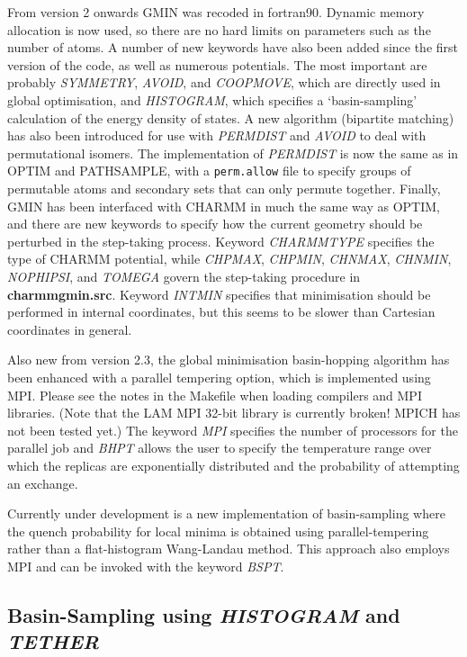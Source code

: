 \documentclass[12pt,a4paper,dvips]{article}
\begin{document}
From version 2 onwards GMIN was recoded in fortran90. 
Dynamic memory allocation is now used, so there are no hard limits on parameters
such as the number of atoms.
A number of new keywords have also been added since the first version of the code,
as well as numerous potentials.
The most important are probably {\it SYMMETRY}, {\it AVOID}, and {\it COOPMOVE}, which 
are directly used in global optimisation, 
and {\it HISTOGRAM}, which specifies a `basin-sampling' calculation of the energy
density of states.
A new algorithm (bipartite matching) has also been introduced for use with {\it PERMDIST}
and {\it AVOID} to deal with permutational isomers.
The implementation of {\it PERMDIST} is now the same as in OPTIM
and PATHSAMPLE, with a {\tt perm.allow} file to specify groups of permutable
atoms and secondary sets that can only permute together.
Finally, GMIN has been interfaced with CHARMM in much the same way as OPTIM, and there
are new keywords to specify how the current geometry should be perturbed in the
step-taking process. Keyword {\it CHARMMTYPE} specifies the type of CHARMM potential,
while {\it CHPMAX}, {\it CHPMIN}, {\it CHNMAX}, {\it CHNMIN},
{\it NOPHIPSI}, and {\it TOMEGA} govern the step-taking procedure in {\bf charmmgmin.src}.
Keyword {\it INTMIN} specifies that minimisation should be performed in internal coordinates,
but this seems to be slower than Cartesian coordinates in general.

Also new from version 2.3, the global minimisation basin-hopping algorithm has been enhanced with a 
parallel tempering option, which is implemented using MPI. Please see the notes
in the Makefile when loading compilers and MPI libraries. 
(Note that the LAM MPI 32-bit library is currently broken! MPICH has not been tested yet.)
The keyword {\it MPI} specifies
the number of processors for the parallel job and {\it BHPT} allows the user to specify the temperature
range over which the replicas are exponentially distributed and the probability of attempting 
an exchange.

Currently under development is a new implementation of basin-sampling where 
the quench probability for local minima is obtained using parallel-tempering rather than
a flat-histogram Wang-Landau method. This approach also employs MPI and can be invoked with 
the keyword {\it BSPT}.

\subsection{Basin-Sampling using {\it HISTOGRAM} and {\it TETHER}}
\end{document}
